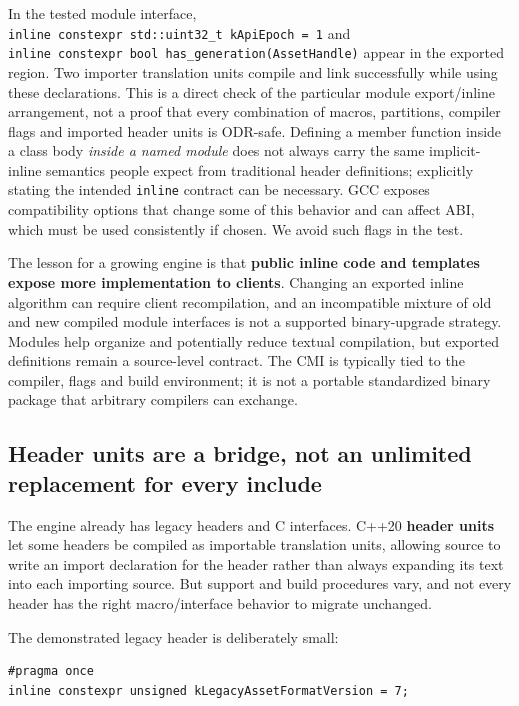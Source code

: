 In the tested module interface, \texttt{inline\ constexpr\ std::uint32\_t\ kApiEpoch\ =\ 1} and \texttt{inline\ constexpr\ bool\ has\_generation(AssetHandle)} appear in the exported region. Two importer translation units compile and link successfully while using these declarations. This is a direct check of the particular module export/inline arrangement, not a proof that every combination of macros, partitions, compiler flags and imported header units is ODR-safe. Defining a member function inside a class body \emph{inside a named module} does not always carry the same implicit-inline semantics people expect from traditional header definitions; explicitly stating the intended \texttt{inline} contract can be necessary. GCC exposes compatibility options that change some of this behavior and can affect ABI, which must be used consistently if chosen. We avoid such flags in the test.

The lesson for a growing engine is that \textbf{public inline code and templates expose more implementation to clients}. Changing an exported inline algorithm can require client recompilation, and an incompatible mixture of old and new compiled module interfaces is not a supported binary-upgrade strategy. Modules help organize and potentially reduce textual compilation, but exported definitions remain a source-level contract. The CMI is typically tied to the compiler, flags and build environment; it is not a portable standardized binary package that arbitrary compilers can exchange.

\subsection{Header units are a bridge, not an unlimited replacement for every include}\label{05-engine-i-ch006-header-units-are-a-bridge-not-an-unlimited-replacement-for-every-include}

The engine already has legacy headers and C interfaces. C++20 \textbf{header units} let some headers be compiled as importable translation units, allowing source to write an import declaration for the header rather than always expanding its text into each importing source. But support and build procedures vary, and not every header has the right macro/interface behavior to migrate unchanged.

The demonstrated legacy header is deliberately small:

\begin{verbatim}
#pragma once
inline constexpr unsigned kLegacyAssetFormatVersion = 7;
\end{verbatim}


